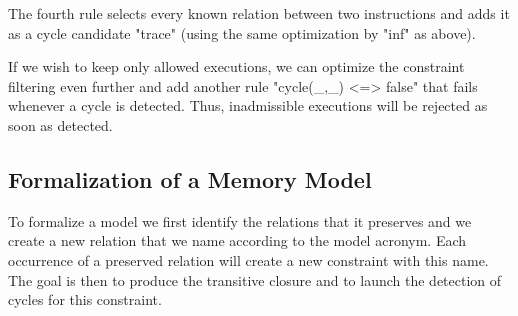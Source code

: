 The fourth rule selects every known relation between two instructions and adds
it as a cycle candidate "trace" (using the same optimization by "inf" as above).

If we wish to keep only allowed executions, we 
can optimize the constraint 
filtering even further and add another rule "cycle(_,_) <=> false" that 
fails whenever a cycle is detected. 
Thus, inadmissible executions will be rejected as soon as detected.

\subsection{Formalization of a Memory Model}\label{subsec:formalization}
To formalize a model we first identify the relations that it preserves
and we create a new relation that we name according to the model
acronym.  Each occurrence of a preserved relation will create a new
constraint with this name. The goal is then to produce the transitive
closure and to launch the detection of cycles for this constraint.

